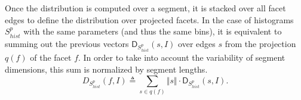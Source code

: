         \begin{figure}[H]
            \begin{center}
            \end{center}
        \end{figure}

        Once the distribution is computed over a segment, it is stacked over all facet edges to define the distribution over projected facets. In the case of histograms $S_{hist}^p$ with the same parameters (and thus the same bins), it is equivalent to summing out the previous vectors $\mathsf{D}_{S_{hist}^p}(s, I)$ over edges $s$ from the projection $q(f)$ of the facet $f$. In order to take into account the variability of segment dimensions, this sum is normalized by segment lengths.
        \begin{equation}
            \label{eq::corr_fac}
            D_{S_{hist}^p}(f, I) \triangleq \sum_{s \in q(f)} \Vert s \Vert \cdot \mathsf{D}_{S_{hist}^p}(s, I).
        \end{equation}

